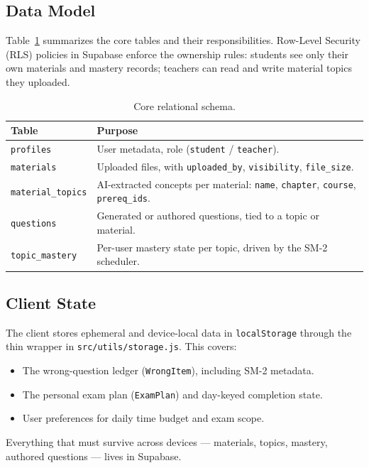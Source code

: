 \documentclass[11pt,a4paper]{article}
\newcommand{\code}[1]{\texttt{\small #1}}
\newcommand{\file}[1]{\textcolor{mcslate}{\texttt{\small #1}}}
\begin{document}
\subsection{Data Model}

Table~\ref{tab:schema} summarizes the core tables and their responsibilities. Row-Level Security (RLS) policies in Supabase enforce the ownership rules: students see only their own materials and mastery records; teachers can read and write material topics they uploaded.

\begin{table}[h]
\centering
\caption{Core relational schema.}
\label{tab:schema}
\small
\begin{tabularx}{\textwidth}{@{}lX@{}}
\toprule
\textbf{Table} & \textbf{Purpose} \\
\midrule
\code{profiles} & User metadata, role (\code{student} / \code{teacher}). \\
\code{materials} & Uploaded files, with \code{uploaded\_by}, \code{visibility}, \code{file\_size}. \\
\code{material\_topics} & AI-extracted concepts per material: \code{name}, \code{chapter}, \code{course}, \code{prereq\_ids}. \\
\code{questions} & Generated or authored questions, tied to a topic or material. \\
\code{topic\_mastery} & Per-user mastery state per topic, driven by the SM-2 scheduler. \\
\bottomrule
\end{tabularx}
\end{table}

\subsection{Client State}

The client stores ephemeral and device-local data in \code{localStorage} through the thin wrapper in \file{src/utils/storage.js}. This covers:

\begin{itemize}
    \item The wrong-question ledger (\code{WrongItem}), including SM-2 metadata.
    \item The personal exam plan (\code{ExamPlan}) and day-keyed completion state.
    \item User preferences for daily time budget and exam scope.
\end{itemize}

Everything that must survive across devices --- materials, topics, mastery, authored questions --- lives in Supabase.
\end{document}
